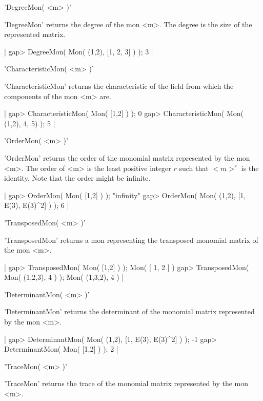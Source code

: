 'DegreeMon( <m> )'

'DegreeMon' returns the degree of the mon <m>. The degree is the size
of the represented matrix.

|    gap> DegreeMon( Mon( (1,2), [1, 2, 3] ) );
    3 |


'CharacteristicMon( <m> )'

'CharacteristicMon' returns the characteristic of the field 
from which the components of the mon <m> are.

|    gap> CharacteristicMon( Mon( [1,2] ) );
    0
    gap> CharacteristicMon( Mon( (1,2), 4, 5) );
    5 |


'OrderMon( <m> )'

'OrderMon' returns the order of the monomial matrix represented by the
mon <m>. The order of <m> is the least positive integer $r$ such that
$<m>^r$ is the identity. Note that the order might be infinite.

|    gap> OrderMon( Mon( [1,2] ) );
    "infinity"
    gap> OrderMon( Mon( (1,2), [1, E(3), E(3)^2] ) );
    6 |


'TransposedMon( <m> )'

'TransposedMon' returns a mon representing the transposed monomial
matrix of the mon <m>.

|    gap> TransposedMon( Mon( [1,2] ) );
    Mon( [ 1, 2 ] )
    gap> TransposedMon( Mon( (1,2,3), 4 ) );
    Mon( (1,3,2), 4 ) |


'DeterminantMon( <m> )'

'DeterminantMon' returns the determinant of the monomial matrix
represented by the mon <m>.

|    gap> DeterminantMon( Mon( (1,2), [1, E(3), E(3)^2] ) );
    -1
    gap> DeterminantMon( Mon( [1,2] ) );
    2 |


'TraceMon( <m> )'

'TraceMon' returns the trace of the monomial matrix
represented by the mon <m>.

